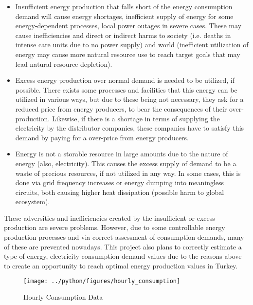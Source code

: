\documentclass[11pt, a4paper, leqno]{article}
\begin{document}
\begin{itemize}
    \item Insufficient energy production that falls short of the energy consumption demand will cause energy shortages, inefficient supply of energy for some energy-dependent processes, local power outages in severe cases. These may cause inefficiencies and direct or indirect harms to society (i.e. deaths in intense care units due to no power supply) and world (inefficient utilization of energy may cause more natural resource use to reach target goals that may lead natural resource depletion).
    \item Excess energy production over normal demand is needed to be utilized, if possible. There exists some processes and facilities that this energy can be utilized in various ways, but due to these being not necessary, they ask for a reduced price from energy producers, to bear the consequences of their over-production. Likewise, if there is a shortage in terms of supplying the electricity by the distributor companies, these companies have to satisfy this demand by paying for a over-price from energy producers.
    \item Energy is not a storable resource in large amounts due to the nature of energy (also, electricity). This causes the excess supply of demand to be a waste of precious resources, if not utilized in any way. In some cases, this is done via grid frequency increases or energy dumping into meaningless circuits, both causing higher heat dissipation (possible harm to global ecosystem).
\end{itemize}

These adversities and inefficiencies created by the insufficient or excess production are severe problems. However, due to some controllable energy production processes and via correct assessment of consumption demands, many of these are prevented nowadays. This project also plans to correctly estimate a type of energy, electricity consumption demand values due to the reasons above to create an opportunity to reach optimal energy production values in Turkey.

\begin{figure}[H]

    \centering
    \texttt{[image: ../python/figures/hourly\_consumption]}

    \caption{Hourly Consumption Data}
    \label{fig:hourly_consumption}

\end{figure}
\end{document}
